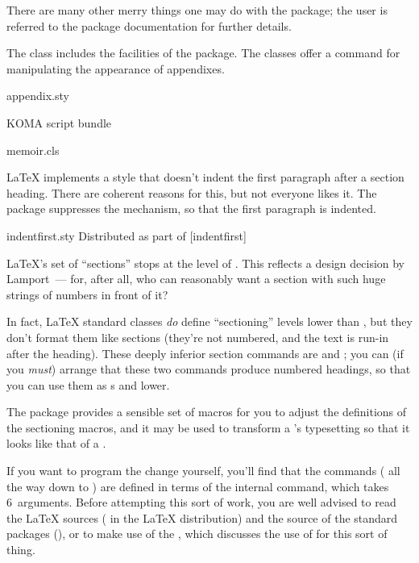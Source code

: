 There are many other merry things one may do with the package; the
user is referred to the package documentation for further details.

The  class includes the facilities of the
 package.  The  classes offer a
 command for manipulating the appearance of appendixes.
\begin{ctanrefs}
\item[appendix.sty]
\item[\nothtml{\rmfamily}KOMA script bundle]
\item[memoir.cls]
\end{ctanrefs}


\LaTeX{} implements a style that doesn't indent the first paragraph
after a section heading.  There are coherent reasons for this, but not
everyone likes it.
The  package
suppresses the mechanism, so that the first paragraph is
indented.
\begin{ctanrefs}
\item[indentfirst.sty]Distributed as part of [indentfirst]
\end{ctanrefs}


\LaTeX{}'s set of ``sections'' stops at the level of
.  This reflects a design decision by Lamport~---
for, after all, who can reasonably want a section with such huge
strings of numbers in front of it?

In fact, \LaTeX{} standard classes \emph{do} define ``sectioning''
levels lower than , but they don't format them like
sections (they're not numbered, and the text is run-in after the
heading).  These deeply inferior section commands are 
and ; you can (if you \emph{must}) arrange that these
two commands produce numbered headings, so that you can use them as
s and lower.

The  package provides a sensible set of macros for
you to adjust the definitions of the sectioning macros, and it may be
used to transform a 's typesetting so that it looks
like that of a .

If you want to program the change yourself, you'll find that the
commands ( all the way down to ) are
defined in terms of the internal  command, which
takes 6~arguments.  Before attempting this sort of work, you are well
advised to read the \LaTeX{} sources ( in the
\LaTeX{} distribution) and the source of the standard packages
(), or to make use of the %
, which
discusses the use of  for this sort of thing.

